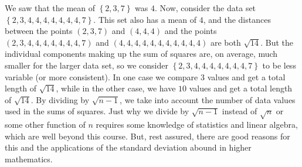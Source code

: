 \documentclass[10pt,]{book}
\theoremstyle{ptxdefinitionnotitle}
\theoremstyle{ptxdefinitiontitle}
\numberwithin{equation}{section}
\begin{document}
We saw that the mean of \(\left\{ 2, 3, 7 \right\}\) was \(4\). Now, consider the data set \(\left\{ 2, 3, 4, 4, 4 ,4, 4, 4, 4, 7 \right\}\). This set also has a mean of \(4\), and the distances between the points \(\left( 2, 3, 7 \right)\) and \(\left( 4, 4, 4 \right)\) and the points \(\left( 2, 3, 4, 4, 4 ,4, 4, 4, 4, 7 \right)\) and \(\left( 4, 4, 4, 4, 4, 4, 4 ,4, 4, 4, 4 \right)\) are both \(\sqrt{14}\). But the individual components making up the sum of squares are, on average, much smaller for the larger data set, so we consider \(\left\{ 2, 3, 4, 4, 4 ,4, 4, 4, 4, 7 \right\}\) to be less variable (or more consistent). In one case we compare \(3\) values and get a total length of \(\sqrt{14}\), while in the other case, we have \(10\) values and get a total length of \(\sqrt{14}\).  By dividing by \(\sqrt{n-1}\), we take into account the number of data values used in the sums of squares. Just why we divide by \(\sqrt{n-1}\) instead of \(\sqrt{n}\) or some other function of \(n\) requires some knowledge of statistics and linear algebra, which are well beyond this course. But, rest assured, there are good reasons for this and the applications of the standard deviation abound in higher mathematics.%
\typeout{************************************************}
\typeout{************************************************}
\end{document}
